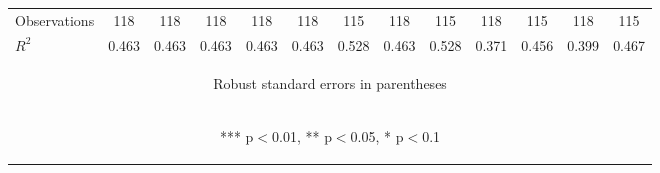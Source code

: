 \begin{center}
\begin{tabular}{lcccccccccccc}
Observations & 118 & 118 & 118 & 118 & 118 & 115 & 118 & 115 & 118 & 115 & 118 & 115 \\
 $R^2$ & 0.463 & 0.463 & 0.463 & 0.463 & 0.463 & 0.528 & 0.463 & 0.528 & 0.371 & 0.456 & 0.399 & 0.467 \\ \hline
\multicolumn{13}{c}{\begin{footnotesize} Robust standard errors in parentheses\end{footnotesize}} \\
\multicolumn{13}{c}{\begin{footnotesize} *** p$<$0.01, ** p$<$0.05, * p$<$0.1\end{footnotesize}} \\
\end{tabular}
\end{center}
